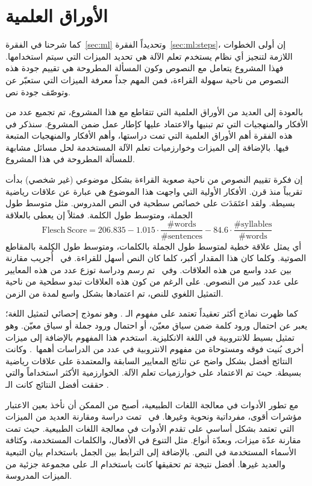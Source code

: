 \section{الأوراق العلمية}
كما شرحنا في الفقرة~\ref{sec:ml} وتحديداً الفقرة~\ref{sec:ml:steps}، إن أولى الخطوات اللازمة لتنجيز أي نظام يستخدم تعلم الآلة
هي تحديد الميزات التي سيتم استخدامها.
فهذا المشروع يتعامل مع النصوص وكون المسألة المطروحة هي تقييم جودة هذه النصوص من ناحية سهولة القراءة،
فمن المهم جداً معرفة الميزات التي ستعبّر عن وتوصّف جودة نص.

بالعودة إلى العديد من الأوراق العلمية التي تتقاطع مع هذا المشروع،
تم تجميع عدد من الأفكار والمنهجيات التي تم تبنيها والاعتماد عليها كإطار عمل ضمن المشروع.
سنذكر في هذه الفقرة أهم الأوراق العلمية التي تمت دراستها،
وأهم الأفكار والمنهجيات المتبعة فيها.
بالإضافة إلى الميزات وخوارزميات تعلم الآلة المستخدمة لحل مسائل مشابهة للمسألة المطروحة في هذا المشروع.

إن فكرة تقييم النصوص من ناحية صعوبة القراءة بشكل موضوعي (غير شخصي) بدأت تقريباً منذ قرن.
الأفكار الأولية التي واجهت هذا الموضوع هي عبارة عن علاقات رياضية بسيطة.
ولقد اعتَمَدَت على خصائص سطحية في النص المدروس.
مثل متوسط طول الجملة، ومتوسط طول الكلمة.
فمثلاً إن  يعطى بالعلاقة
$$ \mathrm{Flesch\ Score} = 206.835 -
1.015 \cdot \frac{\mathrm{\# words}}{\mathrm{\# sentences}}
- 84.6 \cdot \frac{\mathrm{\# syllables}}{\mathrm{\# words}} $$
أي يمثل علاقة خطية لمتوسط طول الجملة بالكلمات، ومتوسط طول الكلمة بالمقاطع الصوتية.
وكلما كان هذا المقدار أكبر، كلما كان النص أسهل للقراءة.
في~\cite{dubay2007} أُجريب مقارنة بين عدد واسع من هذه العلاقات.
وفي~\cite{readability-scores-gutenberg} تم رسم ودراسة توزع عدد من هذه المعايير على عدد كبير من النصوص.
على الرغم من كون هذه العلاقات تبدو سطحية من ناحية التمثيل اللغوي للنص،
تم اعتمادها بشكل واسع لمدة من الزمن.

كما ظهرت نماذج أكثر تعقيداً تعتمد على مفهوم الـ .
وهو نموذج إحصائي لتمثيل اللغة؛ يعبر عن احتمال ورود كلمة ضمن سياق معيّن، أو احتمال ورود جملة أو سياق معيّن.
وهو تمثيل بسيط للانتروبية في اللغة الانكليزية.
استخدم هذا المفهوم بالإضافة إلى ميزات أخرى بُنيت فوقه ومستوحاة من مفهوم الانتروبية في عدد من الدراسات
أهمها~\cite{schwarm2005, petersen2009}.
وكانت النتائج أفضل بشكل واضح عن نتائج المعايير السابقة والمعتمدة على علاقات رياضية بسيطة.
حيث تم الاعتماد على خوارزميات تعلم الآلة.
الخوارزمية الأكثر استخداماً والتي حققت أفضل النتائج كانت الـ .

مع تطور الأدوات في معالجة اللغات الطبيعية، أصبح من الممكن أن نأخذ بعين الاعتبار مؤشرات أقوى، مفرداتية ونحوية وغيرها.
في~\cite{feng-phd, feng2010comparison} تمت دراسة ومقارنة العديد من الميزات
التي تعتمد بشكل أساسي على تقدم الأدوات في معالجة اللغات الطبيعية.
حيث تمت مقارنة عدّة ميزات، وبعدّة أنواع.
مثل التنوع في الأفعال، والكلمات المستخدمة، وكثافة الأسماء المستخدمة في النص.
بالإضافة إلى الترابط بين الجمل باستخدام بيان التبعية والعديد غيرها.
أفضل نتيجة تم تحقيقها كانت باستخدام الـ  على مجموعة جزئية من الميزات المدروسة.

